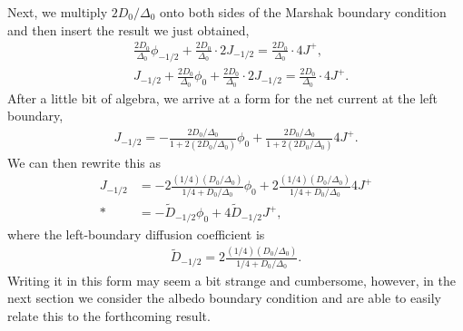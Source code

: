 Next, we multiply $2 D_0 / \Delta_0$ onto both sides of the Marshak boundary condition and then insert the result we just obtained,
\begin{align}
  &\frac{ 2 D_0 }{ \Delta_0 } \phi_{-1/2} + \frac{ 2 D_0 }{ \Delta_0 } \cdot 2 J_{-1/2}  = \frac{ 2 D_0 }{ \Delta_0 } \cdot 4 J^+ , \nonumber \\
  &J_{-1/2} + \frac{ 2 D_0 }{ \Delta_0 } \phi_0 + \frac{ 2 D_0 }{ \Delta_0 } \cdot 2 J_{-1/2}  = \frac{ 2 D_0 }{ \Delta_0 } \cdot 4 J^+ .
\end{align}
After a little bit of algebra, we arrive at a form for the net current at the left boundary,
\begin{align}
  J_{-1/2} = -\frac{ 2 D_0 / \Delta_0 }{ 1 + 2 ( 2 D_0 / \Delta_0 ) } \phi_0 + \frac{ 2 D_0 / \Delta_0 }{ 1 + 2 ( 2 D_0 / \Delta_0 ) } 4 J^+ . \nonumber
\end{align}
We can then rewrite this as
\begin{align}
  J_{-1/2} 
  &= -2 \frac{ ( 1/4 )  ( D_0 / \Delta_0 ) }{ 1/4 + D_0 / \Delta_0 } \phi_0 + 2 \frac{ ( 1/4 ) ( D_0 / \Delta_0 )  }{ 1/4 + D_0 / \Delta_0 }  4 J^+  \nonumber \\*
  &= -\widetilde{D}_{-1/2} \phi_0 + 4 \widetilde{D}_{-1/2} J^+ ,
\end{align}
where the left-boundary diffusion coefficient is
\begin{align}
  \widetilde{D}_{-1/2} = 2 \frac{ ( 1/4 ) ( D_0 / \Delta_0 )  }{ 1/4 + D_0 / \Delta_0 } . \label{Eq:neutronics_finiteDifference_EdgeDiffusionCoefficient_LeftVacuum}
\end{align}
Writing it in this form may seem a bit strange and cumbersome, however, in the next section we consider the albedo boundary condition and are able to easily relate this to the forthcoming result.

